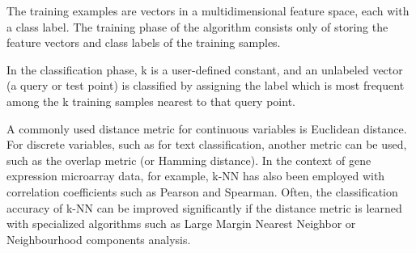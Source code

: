 \documentclass{article}
\begin{document}
\begin{enumerate}
	The training examples are vectors in a multidimensional feature space, each with a class label. The training phase of the algorithm consists only of storing the feature vectors and class labels of the training samples.

	In the classification phase, k is a user-defined constant, and an unlabeled vector (a query or test point) is classified by assigning the label which is most frequent among the k training samples nearest to that query point.

	A commonly used distance metric for continuous variables is Euclidean distance. For discrete variables, such as for text classification, another metric can be used, such as the overlap metric (or Hamming distance). In the context of gene expression microarray data, for example, k-NN has also been employed with correlation coefficients such as Pearson and Spearman. Often, the classification accuracy of k-NN can be improved significantly if the distance metric is learned with specialized algorithms such as Large Margin Nearest Neighbor or Neighbourhood components analysis.


\end{enumerate}
\end{document}
